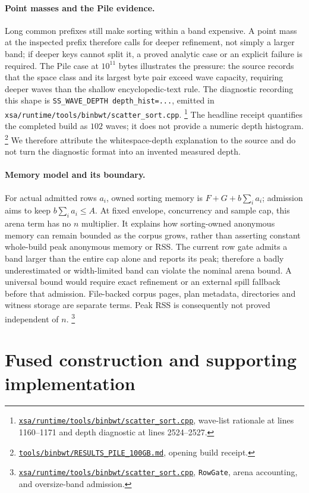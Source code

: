 \documentclass[10pt]{article}
\newcommand{\qnum}[2]{#2}
\newcommand{\ev}[2]{\footnote{\href{https://github.com/pangenome/sxgc/blob/c46a85217b9b269c91179cbebc396f96453181af/#1}{\nolinkurl{#1}}, #2.}}
\begin{document}
\paragraph{Point masses and the Pile evidence.}
Long common prefixes still make sorting within a band expensive. A point mass
at the inspected prefix therefore calls for deeper refinement, not simply a
larger band; if deeper keys cannot split it, a proved analytic case or an
explicit failure is required. The Pile case at $\qnum{input}{10^{11}}$ bytes
illustrates the pressure: the source records that the space class and its
largest byte pair exceed wave capacity, requiring deeper waves than the shallow
encyclopedic-text rule. The diagnostic recording this shape is
\texttt{SS\_WAVE\_DEPTH depth\_hist=...}, emitted in
\texttt{xsa/runtime/tools/binbwt/scatter\_sort.cpp}.
\ev{xsa/runtime/tools/binbwt/scatter_sort.cpp}{wave-list rationale at lines
1160--1171 and depth diagnostic at lines 2524--2527}
The headline receipt quantifies the completed build as
$\qnum{waves}{102}$ waves; it does not provide a numeric depth histogram.
\ev{tools/binbwt/RESULTS_PILE_100GB.md}{opening build receipt}
We therefore attribute the whitespace-depth explanation to the source and do
not turn the diagnostic format into an invented measured depth.

\paragraph{Memory model and its boundary.}
For actual admitted rows $a_i$, owned sorting memory is $F+G+b\sum_i a_i$; admission aims
to keep $b\sum_i a_i\leq A$. At fixed envelope, concurrency and sample cap, this arena term
has no $n$ multiplier. It explains how sorting-owned anonymous memory can remain bounded
as the corpus grows, rather than asserting constant whole-build peak anonymous memory or RSS.
The current row gate admits a band larger than the entire cap alone and reports its peak;
therefore a badly underestimated or width-limited band can violate the nominal arena bound.
A universal bound would require exact refinement or an external spill fallback before that
admission. File-backed corpus pages, plan metadata, directories and witness storage are
separate terms. Peak RSS is consequently not proved independent of $n$.
\ev{xsa/runtime/tools/binbwt/scatter_sort.cpp}{\texttt{RowGate}, arena accounting,
and oversize-band admission}

\section{Fused construction and supporting implementation}
\end{document}
